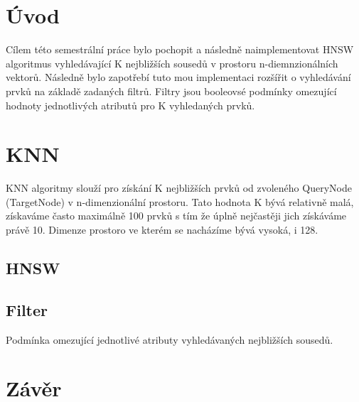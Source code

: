 \documentclass[czech,semestral,dept460,male,csharp,cpdeclaration]{diploma}
\begin{document}
	
	\MakeTitlePages
	
	\chapter{Úvod}
	
		Cílem této semestrální práce bylo pochopit a následně naimplementovat HNSW algoritmus vyhledávající K nejbližších sousedů v prostoru n-diemnzionálních vektorů. Následně bylo zapotřebí tuto mou implementaci rozšířit o vyhledávání prvků na základě zadaných filtrů. Filtry jsou booleovsé podmínky omezující hodnoty jednotlivých atributů pro K vyhledaných prvků.
	
	\chapter{KNN}
	
		KNN algoritmy slouží pro získání K nejbližších prvků od zvoleného QueryNode (TargetNode) v n-dimenzionální prostoru. Tato hodnota K bývá relativně malá, získaváme často maximálně 100 prvků s tím že úplně nejčastěji jich získáváme právě 10. Dimenze prostoro ve kterém se nacházíme bývá vysoká, i 128.
	
	\section{HNSW}
	\section{Filter}
	
		Podmínka omezující jednotlivé atributy vyhledávaných nejbližších sousedů.
	
	\chapter{Závěr}
	
	\nocite{*}
	
	\printbibliography[title={Literatura}, heading=bibintoc]
	
\end{document}
